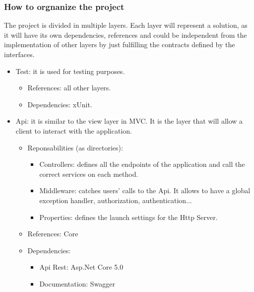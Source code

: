         \subsubsection{How to orgnanize the project}
            The project is divided in multiple layers. Each layer will represent a solution, as it will have its own dependencies, references 
            and could be independent from the implementation of other layers by just fulfilling the contracts defined by the interfaces.
            \begin{itemize}[noitemsep]
                \item Test: it is used for testing purposes.
                    \begin{itemize}[noitemsep]
                        \item References: all other layers.
                        \item Dependencies: xUnit.
                    \end{itemize}
                \item Api: it is similar to the view layer in MVC. It is the layer that will allow a client to interact with the application.
                    \begin{itemize}[noitemsep]
                    \item Reponsabilities (as directories):
                            \begin{itemize}[noitemsep]
                                \item Controllers: defines all the endpoints of the application and call the correct services on each method.
                                \item Middleware: catches users' calls to the Api. It allows to have a global exception handler, authorization, authentication...
                                \item Properties: defines the launch settings for the Http Server.
                            \end{itemize}
                        \item References: Core
                        \item Dependencies:
                            \begin{itemize}[noitemsep]
                                \item Api Rest: Asp.Net Core 5.0
                                \item Documentation: Swagger
                            \end{itemize}

\end{itemize}
\end{itemize}
